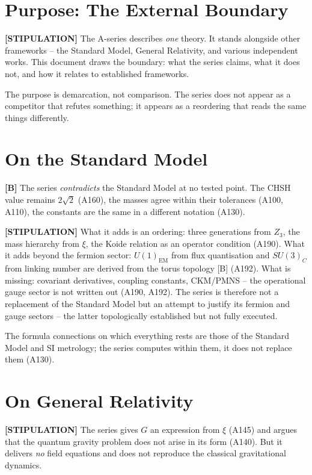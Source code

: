 \section{Purpose: The External Boundary}

\textbf{[STIPULATION]} The A-series describes \emph{one} theory. It stands
alongside other frameworks -- the Standard Model, General Relativity, and various
independent works. This document draws the boundary: what the series claims, what
it does not, and how it relates to established frameworks.

The purpose is demarcation, not comparison. The series does not appear as a
competitor that refutes something; it appears as a reordering that reads the same
things differently.

\section{On the Standard Model}

\textbf{[B]} The series \emph{contradicts} the Standard Model at no tested point.
The CHSH value remains $2\sqrt2$ (A160), the masses agree within their tolerances
(A100, A110), the constants are the same in a different notation (A130).

\textbf{[STIPULATION]} What it adds is an ordering: three generations from
$Z_3$, the mass hierarchy from $\xi$, the Koide relation as an operator condition
(A190). What it adds beyond the fermion sector: $U(1)_\text{EM}$ from flux quantisation
and $SU(3)_C$ from linking number are derived from the torus topology [B] (A192).
What is missing: covariant derivatives, coupling constants, CKM/PMNS -- the
operational gauge sector is not written out (A190, A192). The series is therefore
not a replacement of the Standard Model but an attempt to justify its fermion and
gauge sectors -- the latter topologically established but not fully executed.

The formula connections on which everything rests are those of the Standard Model
and SI metrology; the series computes within them, it does not replace them (A130).

\section{On General Relativity}

\textbf{[STIPULATION]} The series gives $G$ an expression from $\xi$ (A145) and
argues that the quantum gravity problem does not arise in its form (A140). But it
delivers \emph{no} field equations and does not reproduce the classical
gravitational dynamics.

